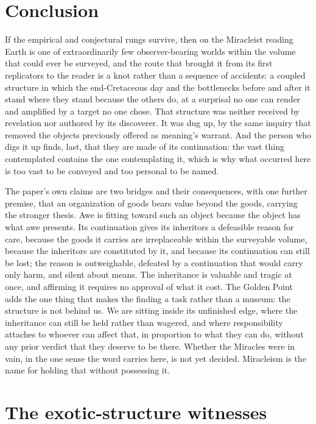 \section{Conclusion}

If the empirical and conjectural rungs survive, then on the Miracleist reading
Earth is one of extraordinarily few observer-bearing worlds within the volume
that could ever be surveyed, and the route that brought it from its first
replicators to the reader is a knot rather than a sequence of accidents: a
coupled structure in which the end-Cretaceous day and the bottlenecks before
and after it stand where they stand because the others do, at a surprisal no
one can render and amplified by a target no one chose. That structure was
neither received by revelation nor authored by its discoverer. It was dug up,
by the same inquiry that removed the objects previously offered as meaning's
warrant. And the person who digs it up finds, last, that they are made of its
continuation: the vast thing contemplated contains the one contemplating it,
which is why what occurred here is too vast to be conveyed and too personal to
be named.

The paper's own claims are two bridges and their consequences, with one
further premise, that an organization of goods bears value beyond the goods,
carrying the stronger thesis. Awe is fitting
toward such an object because the object has what awe presents. Its
continuation gives its inheritors a defeasible reason for care, because the
goods it carries are irreplaceable within the surveyable volume, because the
inheritors are constituted by it, and because its continuation can still be
lost; the reason is outweighable, defeated by a continuation that would carry
only harm, and silent about means. The inheritance is valuable and tragic at
once, and affirming it requires no approval of what it cost. The Golden Point
adds the one thing that makes the finding a task rather than a museum: the
structure is not behind us. We are sitting inside its unfinished edge, where
the inheritance can still be held rather than wagered, and where
responsibility attaches to whoever can affect that, in proportion to what they
can do, without any prior verdict that they deserve to be there. Whether the
Miracles were in vain, in the one sense the word carries here, is not yet
decided. Miracleism is the name for holding that without possessing it.

\appendix
\section{The exotic-structure witnesses}\label{app:witnesses}

